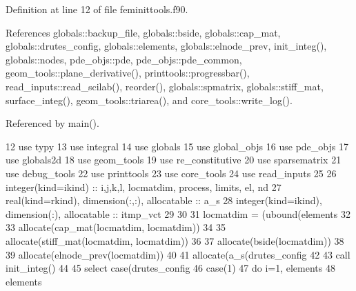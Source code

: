 Definition at line 12 of file feminittools.\+f90.



References globals\+::backup\+\_\+file, globals\+::bside, globals\+::cap\+\_\+mat, globals\+::drutes\+\_\+config, globals\+::elements, globals\+::elnode\+\_\+prev, init\+\_\+integ(), globals\+::nodes, pde\+\_\+objs\+::pde, pde\+\_\+objs\+::pde\+\_\+common, geom\+\_\+tools\+::plane\+\_\+derivative(), printtools\+::progressbar(), read\+\_\+inputs\+::read\+\_\+scilab(), reorder(), globals\+::spmatrix, globals\+::stiff\+\_\+mat, surface\+\_\+integ(), geom\+\_\+tools\+::triarea(), and core\+\_\+tools\+::write\+\_\+log().



Referenced by main().


\begin{DoxyCode}
12       \textcolor{keywordtype}{use }typy
13       \textcolor{keywordtype}{use }integral
14       \textcolor{keywordtype}{use }globals
15       \textcolor{keywordtype}{use }global_objs
16       \textcolor{keywordtype}{use }pde_objs
17       \textcolor{keywordtype}{use }globals2d
18       \textcolor{keywordtype}{use }geom_tools
19       \textcolor{keywordtype}{use }re_constitutive
20       \textcolor{keywordtype}{use }sparsematrix
21       \textcolor{keywordtype}{use }debug_tools
22       \textcolor{keywordtype}{use }printtools
23       \textcolor{keywordtype}{use }core_tools
24       \textcolor{keywordtype}{use }read_inputs
25 
26       \textcolor{keywordtype}{integer(kind=ikind)} :: i,j,k,l, locmatdim, process, limits,  el, nd
27       \textcolor{keywordtype}{real(kind=rkind)}, \textcolor{keywordtype}{dimension(:,:)}, \textcolor{keywordtype}{allocatable} :: a\_s
28       \textcolor{keywordtype}{integer(kind=ikind)}, \textcolor{keywordtype}{dimension(:)}, \textcolor{keywordtype}{allocatable} :: itmp\_vct
29       
30       
31       locmatdim = (ubound(elements%
32   
33       \textcolor{keyword}{allocate}(cap_mat(locmatdim, locmatdim))
34       
35       \textcolor{keyword}{allocate}(stiff_mat(locmatdim, locmatdim))
36       
37       \textcolor{keyword}{allocate}(bside(locmatdim))
38 
39       \textcolor{keyword}{allocate}(elnode_prev(locmatdim))
40 
41       \textcolor{keyword}{allocate}(a\_s(drutes_config%
42 
43       \textcolor{keyword}{call }init_integ()
44 
45       \textcolor{keywordflow}{select case}(drutes_config%
46         \textcolor{keywordflow}{case}(1)
47           \textcolor{keywordflow}{do} i=1, elements%
48             elements%

\end{DoxyCode}
